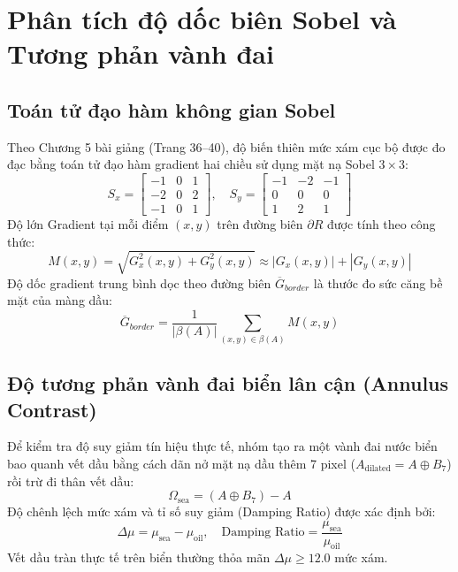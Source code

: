 \section{Phân tích độ dốc biên Sobel và Tương phản vành đai}
\label{sec:edge_and_contrast}

\subsection{Toán tử đạo hàm không gian Sobel}
Theo Chương 5 bài giảng \cite{toan2024xla} (Trang 36--40), độ biến thiên mức xám cục bộ được đo đạc bằng toán tử đạo hàm gradient hai chiều sử dụng mặt nạ Sobel $3 \times 3$:
\begin{equation}
    S_x = \begin{bmatrix} -1 & 0 & 1 \\ -2 & 0 & 2 \\ -1 & 0 & 1 \end{bmatrix}, \quad 
    S_y = \begin{bmatrix} -1 & -2 & -1 \\ 0 & 0 & 0 \\ 1 & 2 & 1 \end{bmatrix}
\end{equation}
Độ lớn Gradient tại mỗi điểm $(x, y)$ trên đường biên $\partial R$ được tính theo công thức:
\begin{equation}
    M(x, y) = \sqrt{G_x^2(x,y) + G_y^2(x,y)} \approx |G_x(x,y)| + |G_y(x,y)|
\end{equation}
Độ dốc gradient trung bình dọc theo đường biên $\overline{G}_{border}$ là thước đo sức căng bề mặt của màng dầu:
\begin{equation}
    \overline{G}_{border} = \frac{1}{|\beta(A)|} \sum_{(x,y) \in \beta(A)} M(x, y)
\end{equation}

\subsection{Độ tương phản vành đai biển lân cận (Annulus Contrast)}
Để kiểm tra độ suy giảm tín hiệu thực tế, nhóm tạo ra một vành đai nước biển bao quanh vết dầu bằng cách dãn nở mặt nạ dầu thêm 7 pixel ($A_{\text{dilated}} = A \oplus B_7$) rồi trừ đi thân vết dầu:
\begin{equation}
    \Omega_{\text{sea}} = (A \oplus B_7) - A
\end{equation}
Độ chênh lệch mức xám và tỉ số suy giảm (Damping Ratio) được xác định bởi:
\begin{equation}
    \Delta \mu = \mu_{\text{sea}} - \mu_{\text{oil}}, \quad \text{Damping Ratio} = \frac{\mu_{\text{sea}}}{\mu_{\text{oil}}}
\end{equation}
Vết dầu tràn thực tế trên biển thường thỏa mãn $\Delta \mu \ge 12.0$ mức xám.

